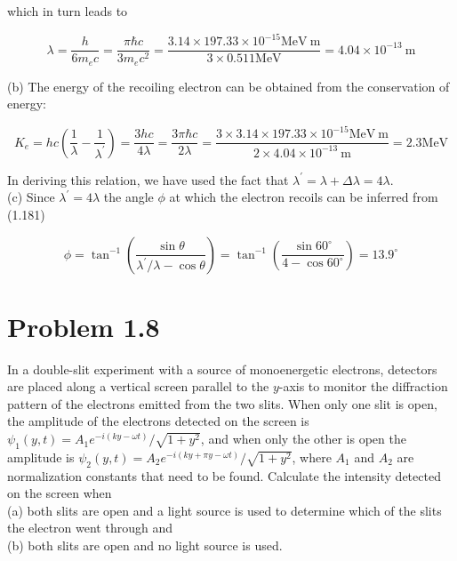 \documentclass[10pt]{article}
\begin{document}
which in turn leads to


\begin{equation*}
\lambda=\frac{h}{6 m_{e} c}=\frac{\pi \hbar c}{3 m_{e} c^{2}}=\frac{3.14 \times 197.33 \times 10^{-15} \mathrm{MeV} \mathrm{~m}}{3 \times 0.511 \mathrm{MeV}}=4.04 \times 10^{-13} \mathrm{~m} \tag{1.187}
\end{equation*}


(b) The energy of the recoiling electron can be obtained from the conservation of energy:


\begin{equation*}
K_{e}=h c\left(\frac{1}{\lambda}-\frac{1}{\lambda^{\prime}}\right)=\frac{3 h c}{4 \lambda}=\frac{3 \pi \hbar c}{2 \lambda}=\frac{3 \times 3.14 \times 197.33 \times 10^{-15} \mathrm{MeV} \mathrm{~m}}{2 \times 4.04 \times 10^{-13} \mathrm{~m}}=2.3 \mathrm{MeV} \tag{1.188}
\end{equation*}


In deriving this relation, we have used the fact that $\lambda^{\prime}=\lambda+\Delta \lambda=4 \lambda$.\\
(c) Since $\lambda^{\prime}=4 \lambda$ the angle $\phi$ at which the electron recoils can be inferred from (1.181)


\begin{equation*}
\phi=\tan ^{-1}\left(\frac{\sin \theta}{\lambda^{\prime} / \lambda-\cos \theta}\right)=\tan ^{-1}\left(\frac{\sin 60^{\circ}}{4-\cos 60^{\circ}}\right)=13.9^{\circ} \tag{1.189}
\end{equation*}


\section*{Problem 1.8}
In a double-slit experiment with a source of monoenergetic electrons, detectors are placed along a vertical screen parallel to the $y$-axis to monitor the diffraction pattern of the electrons emitted from the two slits. When only one slit is open, the amplitude of the electrons detected on the screen is $\psi_{1}(y, t)=A_{1} e^{-i(k y-\omega t)} / \sqrt{1+y^{2}}$, and when only the other is open the amplitude is $\psi_{2}(y, t)=A_{2} e^{-i(k y+\pi y-\omega t)} / \sqrt{1+y^{2}}$, where $A_{1}$ and $A_{2}$ are normalization constants that need to be found. Calculate the intensity detected on the screen when\\
(a) both slits are open and a light source is used to determine which of the slits the electron went through and\\
(b) both slits are open and no light source is used.
\end{document}

